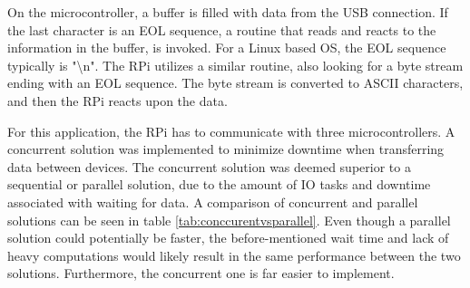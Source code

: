 On the microcontroller, a buffer is filled with data from the USB connection. If the last character is an EOL sequence, a routine that reads and reacts to the information in the buffer, is invoked. For a Linux based OS, the EOL sequence typically is "\textbackslash n". 
The RPi utilizes a similar routine, also looking for a byte stream ending with an EOL sequence. The byte stream is converted to ASCII characters, and then the RPi reacts upon the data. 

For this application, the RPi has to communicate with three microcontrollers. A concurrent solution was implemented to minimize downtime when transferring data between devices. The concurrent solution was deemed superior to a sequential or parallel solution, due to the amount of IO tasks and downtime associated with waiting for data. A comparison of concurrent and parallel solutions can be seen in table \ref{tab:conccurentvsparallel}. Even though a parallel solution could potentially be faster, the before-mentioned wait time and lack of heavy computations would likely result in the same performance between the two solutions. Furthermore, the concurrent one is far easier to implement. 
\begin{table}[h]
\centering
{}
\caption{A comparison of concurrent and parallel programming}
\label{tab:conccurentvsparallel}
\end{table}


